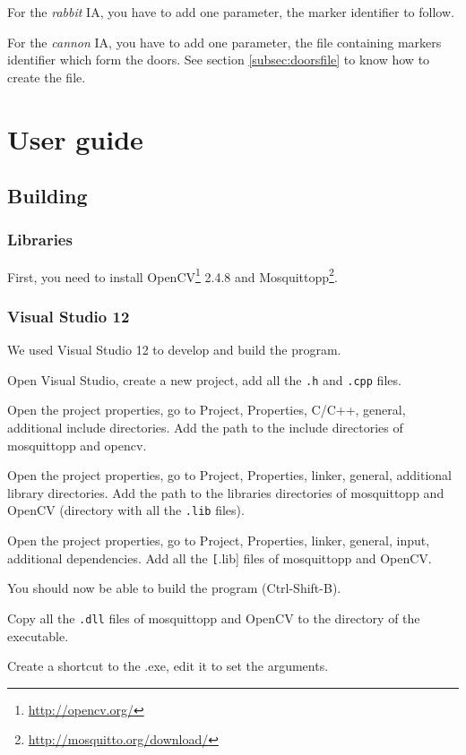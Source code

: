 \documentclass[a4paper,11pt]{report}
\begin{document}
For the \emph{rabbit} IA, you have to add one parameter, the marker identifier
to follow.

For the \emph{cannon} IA, you have to add one parameter, the file containing
markers identifier which form the doors. See section \ref{subsec:doorsfile} to
know how to create the file.

\chapter{User guide}

\section{Building}
\label{sec:build}

\subsection{Libraries}

First, you need to install OpenCV\footnote{\url{http://opencv.org/}} 2.4.8 and
Mosquittopp\footnote{\url{http://mosquitto.org/download/}}.

\subsection{Visual Studio 12}

We used Visual Studio 12 to develop and build the program.

Open Visual Studio, create a new project, add all the \texttt{.h} and
\texttt{.cpp} files.

Open the project properties, go to Project, Properties, C/C++, general,
additional include directories. Add the path to the include directories of
mosquittopp and opencv.

Open the project properties, go to Project, Properties, linker, general,
additional library directories. Add the path to the libraries directories of
mosquittopp and OpenCV (directory with all the \texttt{.lib} files).

Open the project properties, go to Project, Properties, linker, general, input,
additional dependencies. Add all the \texttt[.lib] files of mosquittopp and
OpenCV.

You should now be able to build the program (Ctrl-Shift-B).

Copy all the \texttt{.dll} files of mosquittopp and OpenCV to the directory of
the executable.

Create a shortcut to the .exe, edit it to set the arguments.
\end{document}
